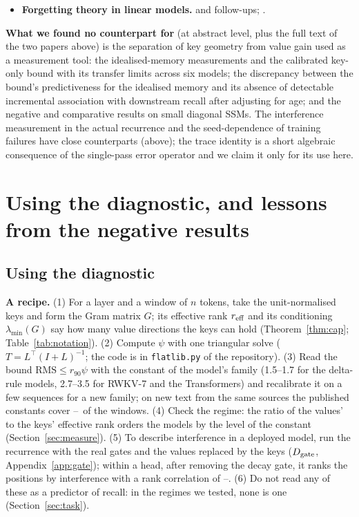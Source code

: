 \documentclass{article}
\begin{document}
\begin{itemize}
  \item \textbf{Forgetting theory in linear models.} \citet{evron2022catastrophic} and follow-ups; \citet{lin2023theory}.
\end{itemize}
\textbf{What we found no counterpart for} (at abstract level, plus the full text of the two papers above) is the separation of key geometry from value gain used as a measurement tool: the idealised-memory measurements and the calibrated key-only bound with its transfer limits across six models; the discrepancy between the bound's predictiveness for the idealised memory and its absence of detectable incremental association with downstream recall after adjusting for age; and the negative and comparative results on small diagonal SSMs. The interference measurement in the actual recurrence and the seed-dependence of training failures have close counterparts (above); the trace identity is a short algebraic consequence of the single-pass error operator and we claim it only for its use here.

\section{Using the diagnostic, and lessons from the negative results}\label{sec:use}
\subsection{Using the diagnostic}
\textbf{A recipe.} (1) For a layer and a window of $n$ tokens, take the unit-normalised keys and form the Gram matrix $G$; its effective rank $r_{\rm eff}$ and its conditioning $\lambda_{\min}(G)$ say how many value directions the keys can hold (Theorem~\ref{thm:cap}; Table~\ref{tab:notation}). (2) Compute $\psi$ with one triangular solve ($T=L^\top(I+L)^{-1}$; the code is in \texttt{flatlib.py} of the repository). (3) Read the bound $\mathrm{RMS}\le r_{90}\psi$ with the constant of the model's family (1.5--1.7 for the delta-rule models, 2.7--3.5 for RWKV-7 and the Transformers) and recalibrate it on a few sequences for a new family; on new text from the same sources the published constants cover \heldCovLo--\heldCovHi\ of the windows. (4) Check the regime: the ratio of the values' to the keys' effective rank orders the models by the level of the constant (Section~\ref{sec:measure}). (5) To describe interference in a deployed model, run the recurrence with the real gates and the values replaced by the keys ($D_{\rm gate}$, Appendix~\ref{app:gate}); within a head, after removing the decay gate, it ranks the positions by interference with a rank correlation of \gatePartLo--\gatePartHi. (6) Do not read any of these as a predictor of recall: in the regimes we tested, none is one (Section~\ref{sec:task}).
\end{document}
